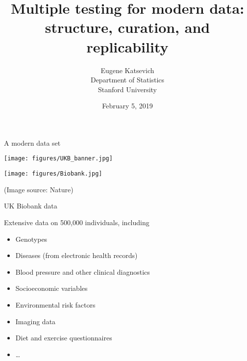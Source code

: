 \documentclass{beamer}
\begin{document}
	

\title{\color{beamer@blendedblue} Multiple testing for modern data: \\ structure, curation, and replicability}
\author{\large Eugene Katsevich \\ \vspace{0.1in} \small Department of Statistics \\ \small Stanford University} 
\date{February 5, 2019}

\begin{frame}
\titlepage
\end{frame}

%

%

\begin{frame}{A modern data set}
	
\vspace{0.15in}

\centering

\texttt{[image: figures/UKB\_banner.jpg]}

\texttt{[image: figures/Biobank.jpg]}
	
\tiny
(Image source: Nature)
\end{frame}

\begin{frame}{UK Biobank data}

Extensive data on 500,000 individuals, including
\begin{itemize}
	\item \color{blue} Genotypes \color{black}
	\item \color{blue} Diseases	(from electronic health records)\color{black}
	\item Blood pressure and other clinical diagnostics
	\item Socioeconomic variables
	\item Environmental risk factors
	\item Imaging data
	\item Diet and exercise questionnaires
	\item \dots
\end{itemize}


\end{frame}
\end{document}
